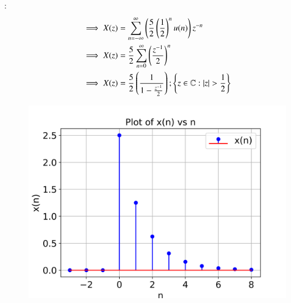 \documentclass[journal,12pt,twocolumn]{IEEEtran}
\theoremstyle{remark}
\begin{document}
:
\begin{align}
\implies X(z) &= \sum_{n=-\infty}^{\infty}\left(\dfrac{5}{2}\left(\dfrac{1}{2}\right)^n u(n)\right) z^{-n} \\
 \implies X(z) &= \dfrac{5}{2}\sum_{n=0}^{\infty}\left(\dfrac{z
 ^{-1}}{2}\right)^n \\
\implies X(z) &=\dfrac{5}{2}\left(\dfrac{1}{1-\frac{z^{-1}}{2}}\right) ;\cbrak{z\in\mathbb{C} : |z|>\dfrac{1}{2}}
\end{align}
\vspace{5cm}
\begin{figure}[ht]
    \centering
    \includegraphics[width = \columnwidth]{figs/stem plot.png}
  \caption{}
    \label{fig:graph1}
\end{figure} 


\end{document}
